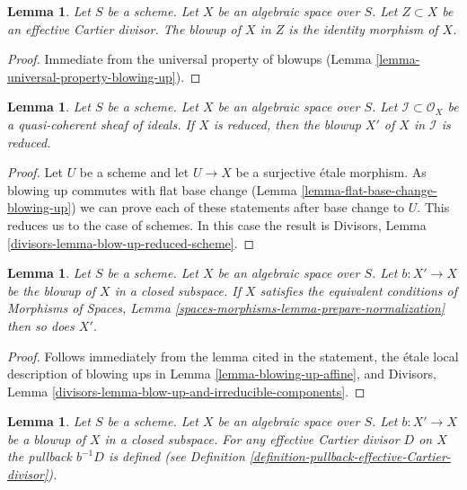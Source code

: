 \documentclass{stacks-project}
\theoremstyle{plain}
\newtheorem{lemma}[subsection]{Lemma}
\theoremstyle{definition}
\theoremstyle{remark}
\numberwithin{equation}{subsection}
\begin{document}
\begin{lemma}
\label{lemma-blow-up-effective-Cartier-divisor}
Let $S$ be a scheme. Let $X$ be an algebraic space over $S$.
Let $Z \subset X$ be an effective Cartier divisor.
The blowup of $X$ in $Z$ is the identity morphism of $X$.
\end{lemma}

\begin{proof}
Immediate from the universal property of blowups
(Lemma \ref{lemma-universal-property-blowing-up}).
\end{proof}

\begin{lemma}
\label{lemma-blow-up-reduced-space}
Let $S$ be a scheme. Let $X$ be an algebraic space over $S$.
Let $\mathcal{I} \subset \mathcal{O}_X$ be a
quasi-coherent sheaf of ideals. If $X$ is reduced, then the
blowup $X'$ of $X$ in $\mathcal{I}$ is reduced.
\end{lemma}

\begin{proof}
Let $U$ be a scheme and let $U \to X$ be a surjective \'etale morphism.
As blowing up commutes with flat base change
(Lemma \ref{lemma-flat-base-change-blowing-up})
we can prove each of these statements after base change to $U$.
This reduces us to the case of schemes.
In this case the result is
Divisors, Lemma \ref{divisors-lemma-blow-up-reduced-scheme}.
\end{proof}

\begin{lemma}
\label{lemma-blowup-finite-nr-irreducibles}
Let $S$ be a scheme. Let $X$ be an algebraic space over $S$. Let
$b : X' \to X$ be the blowup of $X$ in a closed subspace. If
$X$ satisfies the equivalent conditions of
Morphisms of Spaces, Lemma \ref{spaces-morphisms-lemma-prepare-normalization}
then so does $X'$.
\end{lemma}

\begin{proof}
Follows immediately from the lemma cited in the statement,
the \'etale local description of blowing ups in
Lemma \ref{lemma-blowing-up-affine}, and
Divisors, Lemma \ref{divisors-lemma-blow-up-and-irreducible-components}.
\end{proof}

\begin{lemma}
\label{lemma-blow-up-pullback-effective-Cartier}
Let $S$ be a scheme. Let $X$ be an algebraic space over $S$.
Let $b : X' \to X$ be a blowup of $X$ in a closed subspace.
For any effective Cartier divisor $D$ on $X$ the pullback
$b^{-1}D$ is defined (see Definition
\ref{definition-pullback-effective-Cartier-divisor}).
\end{lemma}
\end{document}

